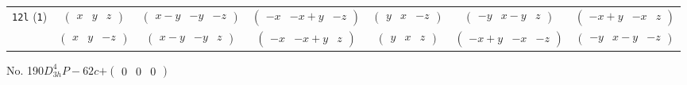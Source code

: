 \documentclass[fleqn,9pt,landscape]{jsarticle}
\begin{document}
\begin{center}
\begin{longtable}{ccccccc}
{\tt 12l} ({\tt 1}) & $ \begin{pmatrix} x & y & z \end{pmatrix} $ & $ \begin{pmatrix} x - y & - y & - z \end{pmatrix} $ & $ \begin{pmatrix} - x & - x + y & - z \end{pmatrix} $ & $ \begin{pmatrix} y & x & - z \end{pmatrix} $ & $ \begin{pmatrix} - y & x - y & z \end{pmatrix} $ & $ \begin{pmatrix} - x + y & - x & z \end{pmatrix} $ \\
& $ \begin{pmatrix} x & y & - z \end{pmatrix} $ & $ \begin{pmatrix} x - y & - y & z \end{pmatrix} $ & $ \begin{pmatrix} - x & - x + y & z \end{pmatrix} $ & $ \begin{pmatrix} y & x & z \end{pmatrix} $ & $ \begin{pmatrix} - x + y & - x & - z \end{pmatrix} $ & $ \begin{pmatrix} - y & x - y & - z \end{pmatrix} $ \\
\end{longtable}
\end{center}
\newpage
No. 190\quad$D_{3h}^{4}$\quad$P-62c$\quad[ hexagonal ]\quad$+\begin{pmatrix} 0 & 0 & 0 \end{pmatrix}$
\end{document}
